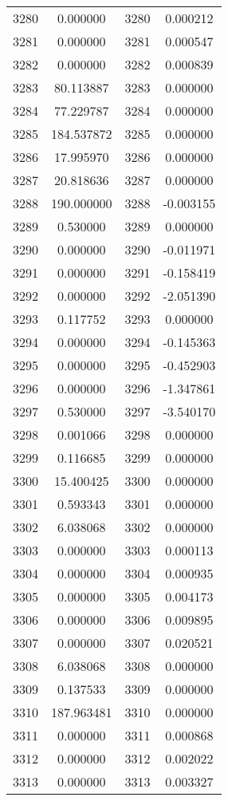 \documentclass[12pt]{article}
\begin{document}
\begin{longtable}{@{}cccc@{}}
3280 & 0.000000 & 3280 & 0.000212 \\
3281 & 0.000000 & 3281 & 0.000547 \\
3282 & 0.000000 & 3282 & 0.000839 \\
3283 & 80.113887 & 3283 & 0.000000 \\
3284 & 77.229787 & 3284 & 0.000000 \\
3285 & 184.537872 & 3285 & 0.000000 \\
3286 & 17.995970 & 3286 & 0.000000 \\
3287 & 20.818636 & 3287 & 0.000000 \\
3288 & 190.000000 & 3288 & -0.003155 \\
3289 & 0.530000 & 3289 & 0.000000 \\
3290 & 0.000000 & 3290 & -0.011971 \\
3291 & 0.000000 & 3291 & -0.158419 \\
3292 & 0.000000 & 3292 & -2.051390 \\
3293 & 0.117752 & 3293 & 0.000000 \\
3294 & 0.000000 & 3294 & -0.145363 \\
3295 & 0.000000 & 3295 & -0.452903 \\
3296 & 0.000000 & 3296 & -1.347861 \\
3297 & 0.530000 & 3297 & -3.540170 \\
3298 & 0.001066 & 3298 & 0.000000 \\
3299 & 0.116685 & 3299 & 0.000000 \\
3300 & 15.400425 & 3300 & 0.000000 \\
3301 & 0.593343 & 3301 & 0.000000 \\
3302 & 6.038068 & 3302 & 0.000000 \\
3303 & 0.000000 & 3303 & 0.000113 \\
3304 & 0.000000 & 3304 & 0.000935 \\
3305 & 0.000000 & 3305 & 0.004173 \\
3306 & 0.000000 & 3306 & 0.009895 \\
3307 & 0.000000 & 3307 & 0.020521 \\
3308 & 6.038068 & 3308 & 0.000000 \\
3309 & 0.137533 & 3309 & 0.000000 \\
3310 & 187.963481 & 3310 & 0.000000 \\
3311 & 0.000000 & 3311 & 0.000868 \\
3312 & 0.000000 & 3312 & 0.002022 \\
3313 & 0.000000 & 3313 & 0.003327 \\

\end{longtable}
\end{document}

